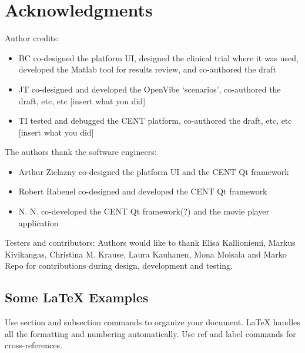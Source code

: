 \documentclass[fleqn,10pt]{wlpeerj}
\begin{document}
\lipsum[11] %








\section*{Acknowledgments}

Author credits:
\begin{itemize}
	\item BC co-designed the platform UI, designed the clinical trial where it was used, developed the Matlab tool for results review, and co-authored the draft
	
	\item JT co-designed and developed the OpenVibe ‘scenarios’, co-authored the draft, etc, etc [insert what you did]
	
	\item TI tested and debugged the CENT platform, co-authored the draft, etc, etc [insert what you did]
	
\end{itemize}

The authors thank the software engineers:
\begin{itemize}
	\item Arthur Zielazny co-designed the platform UI and the CENT Qt framework

	\item Robert Rabenel co-designed and developed the CENT Qt framework

	\item N. N. co-developed the CENT Qt framework(?) and the movie player application

\end{itemize}

Testers and contributors:
Authors would like to thank Elisa Kallioniemi, Markus Kivikangas, Christina M. Krause, Laura Kauhanen, Mona Moisala and Marko Repo for contributions during design, development and testing.


\newpage

\subsection*{Some \LaTeX{} Examples}
\label{sec:examples}

Use section and subsection commands to organize your document. \LaTeX{} handles all the formatting and numbering automatically. Use ref and label commands for cross-references.
\end{document}
